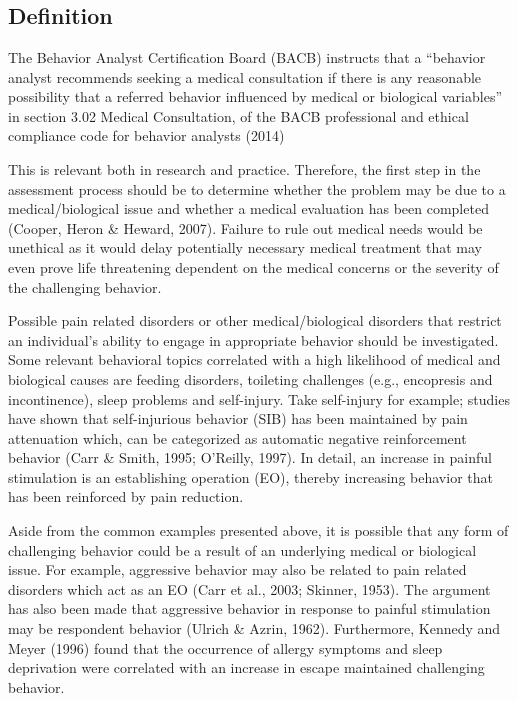 \clearpage \section[\fourgTwo{}]{\fourgTwo{}%
              }
\subsection{Definition}
The Behavior Analyst Certification Board (BACB) instructs that a ``behavior analyst recommends seeking a medical consultation if there is any reasonable possibility that a referred behavior influenced by medical or biological variables'' in section 3.02 Medical Consultation, of the BACB professional and ethical compliance code for behavior analysts (2014)

This is relevant both in research and practice. Therefore, the first step in the assessment process should be to determine whether the problem may be due to a medical/biological issue and whether a medical evaluation has been completed (Cooper, Heron \& Heward, 2007). Failure to rule out medical needs would be unethical as it would delay potentially necessary medical treatment that may even prove life threatening dependent on the medical concerns or the severity of the challenging behavior.

Possible pain related disorders or other medical/biological disorders that restrict an individual's ability to engage in appropriate behavior should be investigated.  Some relevant behavioral topics correlated with a high likelihood of medical and biological causes are feeding disorders, toileting challenges (e.g., encopresis and incontinence), sleep problems and self-injury. Take self-injury for example; studies have shown that self-injurious behavior (SIB) has been maintained by pain attenuation which, can be categorized as automatic negative reinforcement behavior (Carr \& Smith, 1995; O'Reilly, 1997).  In detail, an increase in painful stimulation is an establishing operation (EO), thereby increasing behavior that has been reinforced by pain reduction.

Aside from the common examples presented above, it is possible that any form of challenging behavior could be a result of an underlying medical or biological issue. For example, aggressive behavior may also be related to pain related disorders which act as an EO (Carr et al., 2003; Skinner, 1953). The argument has also been made that aggressive behavior in response to painful stimulation may be respondent behavior (Ulrich \& Azrin, 1962). Furthermore, Kennedy and Meyer (1996) found that the occurrence of allergy symptoms and sleep deprivation were correlated with an increase in escape maintained challenging behavior. 

